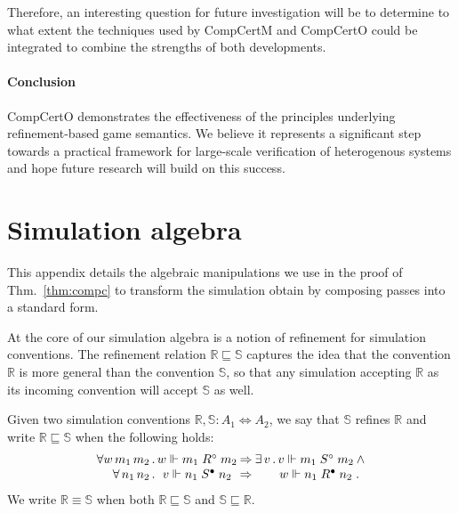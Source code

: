 \documentclass[acmsmall,authordraft]{acmart}
\newcommand{\que}{\circ}
\newcommand{\ans}{\bullet}
\newcommand{\scref}{\sqsubseteq}
\begin{document}
Therefore,
an interesting question for future investigation
will be to determine to what extent
the techniques used by CompCertM and CompCertO
could be integrated to combine
the strengths of both developments.


\paragraph{Conclusion} %

CompCertO
demonstrates the effectiveness
of the principles underlying
refinement-based game semantics.
We believe it represents a significant step towards
a practical framework
for large-scale verification of heterogenous systems
and hope future research will build on this success.






\appendix
\section{Simulation algebra} \label{sec:simalg} %

This appendix details
the algebraic manipulations we use
in the proof of Thm.~\ref{thm:compc}
to transform the simulation
obtain by composing passes
into a standard form.

At the core of our simulation algebra is
a notion of refinement for simulation conventions.
The refinement relation $\mathbb{R} \scref \mathbb{S}$
captures the idea that the convention $\mathbb{R}$
is more general than the convention $\mathbb{S}$,
so that any simulation accepting $\mathbb{R}$ as its
incoming convention will accept $\mathbb{S}$ as well.

\begin{definition} %
Given two simulation conventions
$\mathbb{R}, \mathbb{S} : A_1 \Leftrightarrow A_2$,
we say that
$\mathbb{S}$ refines $\mathbb{R}$ and write
$\mathbb{R} \scref \mathbb{S}$
when the following holds:
\[
    \begin{array}{r@{}c@{\:\Rightarrow\:}c@{}c@{}l}
      \forall w \, m_1 \, m_2 \,.\, &
      w \Vdash m_1 \mathrel{R^\que} m_2 &
      \exists \, v \,.\, &
      v \Vdash m_1 \mathrel{S^\que} m_2 &
      \: \wedge \\
      \forall \, n_1 \, n_2 \,.\, &
      v \Vdash n_1 \mathrel{S^\ans} n_2 &
      &
      w \Vdash n_1 \mathrel{R^\ans} n_2 & \,.
    \end{array}
\]
We write $\mathbb{R} \equiv \mathbb{S}$ when both
$\mathbb{R} \scref \mathbb{S}$ and
$\mathbb{S} \scref \mathbb{R}$.
\end{definition}
\end{document}
